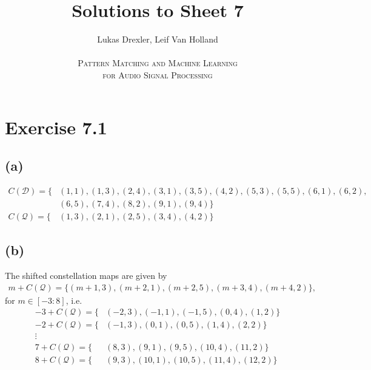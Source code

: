 \documentclass[12pt]{article}
\begin{document}
\title{Solutions to Sheet 7}
\author{Lukas Drexler, Leif Van Holland \\ \\
\textsc{Pattern Matching and Machine Learning} \\
\textsc{for Audio Signal Processing}}
\maketitle

\section*{Exercise 7.1}
\subsection*{(a)}
\begin{align*}
C(\mathcal{D}) = \lbrace &(1,1),(1,3),(2,4),(3,1),(3,5),(4,2),(5,3),(5,5),(6,1),(6,2),
\\ &(6,5),(7,4),(8,2),(9,1),(9,4)\rbrace\\
C(\mathcal{Q}) = \lbrace &(1,3),(2,1),(2,5),(3,4),(4,2) \rbrace
\end{align*}

\subsection*{(b)}
The shifted constellation maps are given by
\begin{align*}
m + C(\mathcal{Q}) = \lbrace (m+1,3),(m+2,1),(m+2,5),(m+3,4),(m+4,2) \rbrace,
\end{align*}
for $m \in \left[-3:8\right]$, i.e.
\begin{align*}
-3 + C(\mathcal{Q}) = \lbrace &(-2,3),(-1,1),(-1,5),(0,4),(1,2) \rbrace\\
-2 + C(\mathcal{Q}) = \lbrace &(-1,3),(0,1),(0,5),(1,4),(2,2) \rbrace\\
\vdots\\
7 + C(\mathcal{Q}) = \lbrace &(8,3),(9,1),(9,5),(10,4),(11,2) \rbrace\\
8 + C(\mathcal{Q}) = \lbrace &(9,3),(10,1),(10,5),(11,4),(12,2) \rbrace\\
\end{align*}
\end{document}
